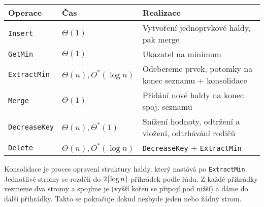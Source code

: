 

 {\footnotesize
    \begin{tabular}{ l l l }
        Operace & Čas & Realizace \\ \hline
        \texttt{Insert} & $\Theta(1)$ & Vytvoření jednoprvkové haldy, pak merge \\
        \texttt{GetMin} & $\Theta(1)$ & Ukazatel na minimum \\
        \texttt{ExtractMin} & $\Theta(n), O^*(\log n)$ & {\scriptsize Odebereme prvek, potomky na konec seznamu + konsolidace } \\
        \texttt{Merge} & $\Theta(1)$ & Přidání nové haldy na konec spoj. seznamu \\
        \texttt{DecreaseKey} & $\Theta(n), \Theta^*(1)$ & {\scriptsize Snížení hodnoty, odtržení a vložení, odtrhávání rodičů } \\
        \texttt{Delete} & $\Theta(n), O^*(\log n)$ & \texttt{DecreaseKey} + \texttt{ExtractMin} \\
    \end{tabular}
}

 {
    Konsolidace je proces opravení struktury haldy, který nastává po \texttt{ExtractMin}.
    Jednotlivé stromy se rozdělí do $2\lceil\log n\rceil$ přihrádek podle řádu.
    Z každé přihrádky vezmeme dva stromy a spojíme je (vyšší kořen se připojí pod nižší) a dáme do další přihrádky.
    Takto se pokračuje dokud nezbyde jeden nebo žádný strom.
}
